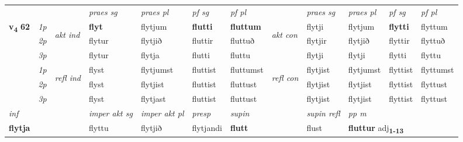 \begin{longtable}[l]{X>{\footnotesize\itshape}llXXXXlXXXX}
 & &   & \textit{praes sg}  & \textit{praes pl}    & \textit{ pf sg} & \textit{pf pl} & & \textit{praes sg}  & \textit{praes pl}    & \textit{pf sg} & \textit{pf pl }  \\ \cmidrule{4-7} \cmidrule{9-12}
 \multirow{2}{*}{{{\textbf{v{\textsubscript{4}}} \Large{\textbf{62}}}}}  & 1p & \multirow{3}{*}{\begin{turn}{90}\textit{akt ind}\end{turn}} & \textbf{flyt} & flytjum & \textbf{flutti} & \textbf{fluttum} & \multirow{3}{*}{\begin{turn}{90}\textit{akt con}\end{turn}} &flytji & flytjum & \textbf{flytti} & flyttum\\*
 & 2p &  &  flytur  & flytjið & fluttir & fluttuð & & flytjir & flytjið & flyttir & flyttuð \\*
 & 3p &  & flytur & flytja & flutti & fluttu & & flytji & flytji& flytti & flyttu \\*
\cmidrule{4-7} \cmidrule{9-12}
 & 1p & \multirow{3}{*}{\begin{turn}{90}\textit{refl ind}\end{turn}}  & flyst & flytjumst & fluttist & fluttumst & \multirow{3}{*}{\begin{turn}{90}\textit{refl con}\end{turn}}  &flytjist & flytjumst & flyttist & flyttumst \\*
 & 2p &  & flyst & flytjist & fluttist & fluttust & &flytjist & flytjist & flyttist & flyttust \\*
 & 3p  & & flyst & flytjast & fluttist & fluttust & & flytjist & flytjist& flyttist & flyttust \\*
\cmidrule{4-7} \cmidrule{9-12}

   {\textit{inf}} & &  & \textit{imper akt sg} & \textit{imper akt pl}   & \textit{presp} & \textit{supin} && \textit{supin refl} & \textit{pp m} \\*
  {\textbf{flytja}} & && flyttu  & flytjið   & flytjandi &  \textbf{flutt} && flust & \multicolumn{2}{l}{\textbf{fluttur} adj\textbf{\textsubscript{1-13}}} \\*

\midrule


\end{longtable}
